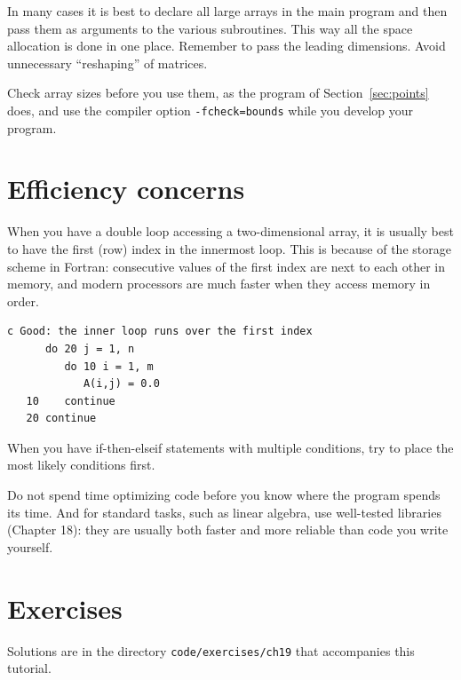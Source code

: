 In many cases it is best to declare all large arrays in the main program and then pass them as arguments to the various subroutines. This way all the space allocation is done in one place. Remember to pass the leading dimensions. Avoid unnecessary ``reshaping'' of matrices.

Check array sizes before you use them, as the program of Section~\ref{sec:points} does, and use the compiler option \texttt{-fcheck=bounds} while you develop your program.

\section{Efficiency concerns}

When you have a double loop accessing a two-dimensional array, it is usually best to have the first (row) index in the innermost loop. This is because of the storage scheme in Fortran: consecutive values of the first index are next to each other in memory, and modern processors are much faster when they access memory in order.

\begin{lstlisting}[style=fortran77]
c Good: the inner loop runs over the first index
      do 20 j = 1, n
         do 10 i = 1, m
            A(i,j) = 0.0
   10    continue
   20 continue
\end{lstlisting}

When you have if-then-elseif statements with multiple conditions, try to place the most likely conditions first.

Do not spend time optimizing code before you know where the program spends its time. And for standard tasks, such as linear algebra, use well-tested libraries (Chapter 18): they are usually both faster and more reliable than code you write yourself.

\section{Exercises}

Solutions are in the directory \texttt{code/exercises/ch19} that accompanies this tutorial.

